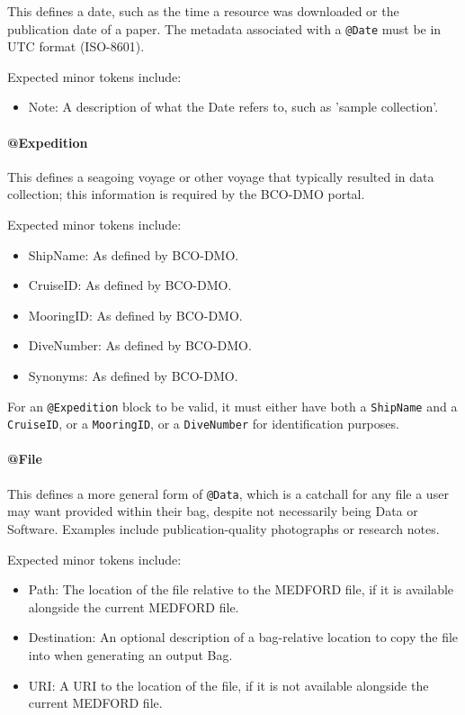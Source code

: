 \documentclass[10pt]{article}
\begin{document}
    This defines a date, such as the time a resource was downloaded or the publication date of a paper. The metadata associated with a \texttt{@Date} must be in UTC format (ISO-8601).
    
    Expected minor tokens include:
    \begin{itemize}
        \item Note: A description of what the Date refers to, such as 'sample collection'.
    \end{itemize}
    
    \paragraph{@Expedition}
    
    This defines a seagoing voyage or other voyage that typically resulted in data collection; this information is required by the BCO-DMO portal.
    
    Expected minor tokens include:
    \begin{itemize}
        \item ShipName: As defined by BCO-DMO.
        \item CruiseID: As defined by BCO-DMO.
        \item MooringID: As defined by BCO-DMO.
        \item DiveNumber: As defined by BCO-DMO.
        \item Synonyms: As defined by BCO-DMO.
    \end{itemize}
    
    For an \texttt{@Expedition} block to be valid, it must either have both a \texttt{ShipName} and a \texttt{CruiseID}, or a \texttt{MooringID}, or a \texttt{DiveNumber} for identification purposes.
    
    \paragraph{@File}
    
    This defines a more general form of \texttt{@Data}, which is a catchall for any file a user may want provided within their bag, despite not necessarily being Data or Software. Examples include publication-quality photographs or research notes. 
    
    Expected minor tokens include:
    \begin{itemize}
        \item Path: The location of the file relative to the MEDFORD file, if it is available alongside the current MEDFORD file.
        \item Destination: An optional description of a bag-relative location to copy the file into when generating an output Bag.
        \item URI: A URI to the location of the file, if it is not available alongside the current MEDFORD file.
    \end{itemize}
    
\end{document}
